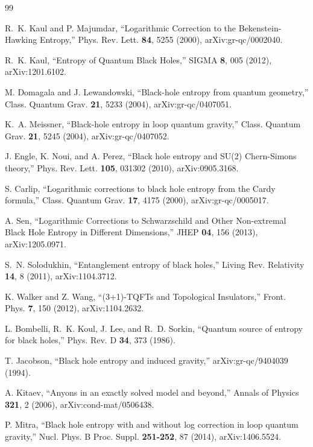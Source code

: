 \documentclass[aps,prd,twocolumn,showpacs,superscriptaddress,nofootinbib]{revtex4-2}
\begin{document}
\begin{thebibliography}{99}

R.~K. Kaul and P. Majumdar, ``Logarithmic Correction to the
Bekenstein-Hawking Entropy,''
Phys. Rev. Lett. \textbf{84}, 5255 (2000), arXiv:gr-qc/0002040.

R.~K. Kaul, ``Entropy of Quantum Black Holes,''
SIGMA \textbf{8}, 005 (2012), arXiv:1201.6102.

M. Domagala and J. Lewandowski, ``Black-hole entropy from quantum
geometry,'' Class. Quantum Grav. \textbf{21}, 5233 (2004),
arXiv:gr-qc/0407051.

K.~A. Meissner, ``Black-hole entropy in loop quantum gravity,''
Class. Quantum Grav. \textbf{21}, 5245 (2004), arXiv:gr-qc/0407052.

J. Engle, K. Noui, and A. Perez, ``Black hole entropy and SU(2)
Chern-Simons theory,'' Phys. Rev. Lett. \textbf{105}, 031302
(2010), arXiv:0905.3168.

S. Carlip, ``Logarithmic corrections to black hole entropy from the
Cardy formula,'' Class. Quantum Grav. \textbf{17}, 4175 (2000),
arXiv:gr-qc/0005017.

A. Sen, ``Logarithmic Corrections to Schwarzschild and Other
Non-extremal Black Hole Entropy in Different Dimensions,''
JHEP \textbf{04}, 156 (2013), arXiv:1205.0971.

S.~N. Solodukhin, ``Entanglement entropy of black holes,''
Living Rev. Relativity \textbf{14}, 8 (2011), arXiv:1104.3712.

K. Walker and Z. Wang, ``(3+1)-TQFTs and Topological Insulators,''
Front. Phys. \textbf{7}, 150 (2012), arXiv:1104.2632.

L. Bombelli, R.~K. Koul, J. Lee, and R.~D. Sorkin, ``Quantum source
of entropy for black holes,'' Phys. Rev. D \textbf{34}, 373 (1986).

T. Jacobson, ``Black hole entropy and induced gravity,''
arXiv:gr-qc/9404039 (1994).

A. Kitaev, ``Anyons in an exactly solved model and beyond,''
Annals of Physics \textbf{321}, 2 (2006), arXiv:cond-mat/0506438.

P. Mitra, ``Black hole entropy with and without log correction in
loop quantum gravity,'' Nucl. Phys. B Proc. Suppl. \textbf{251-252},
87 (2014), arXiv:1406.5524.


\end{thebibliography}
\end{document}
